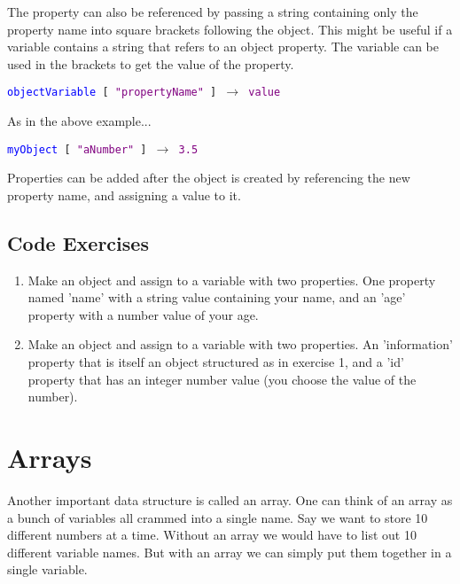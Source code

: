  The property can also be referenced by passing a string containing only the property name into square brackets following the object. This might be useful if a variable contains a string that refers to an object property. The variable can be used in the brackets to get the value of the property.
 
\begin{center}
	\texttt{\textcolor{blue}{objectVariable} [ \textcolor{purple}{"propertyName"} ] $\rightarrow$ \textcolor{purple}{value}}
\end{center}

As in the above example...

\begin{center}
	\texttt{\textcolor{blue}{myObject} [ \textcolor{purple}{"aNumber"} ] $\rightarrow$ \textcolor{purple}{3.5}}
\end{center}

Properties can be added after the object is created by referencing the new property name, and assigning a value to it. 



\subsection{Code Exercises}

\begin{enumerate}
	\item Make an object and assign to a variable with two properties. One property named 'name' with a string value containing your name, and an 'age' property with a number value of your age.
	
	\item Make an object and assign to a variable with two properties. An 'information' property that is itself an object structured as in exercise 1, and a 'id' property that has an integer number value (you choose the value of the number).
\end{enumerate}

\section{Arrays}


Another important data structure is called an array. One can think of an array as a bunch of variables all crammed into a single name. Say we want to store 10 different numbers at a time. Without an array we would have to list out 10 different variable names. But with an array we can simply put them together in a single variable.\\

